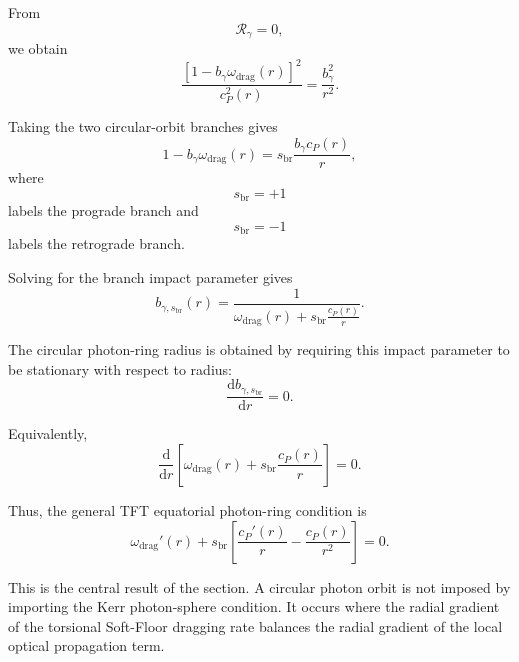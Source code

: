From
\begin{equation}
    \mathcal{R}_{\gamma} = 0,
\end{equation}
we obtain
\begin{equation}
    \frac{\left[ 1 - b_{\gamma}\omega_{\mathrm{drag}}(r) \right]^2}{c_P^2(r)} = \frac{b_{\gamma}^2}{r^2}.
\end{equation}

Taking the two circular-orbit branches gives
\begin{equation}
    1 - b_{\gamma}\omega_{\mathrm{drag}}(r) = s_{\mathrm{br}} \frac{b_{\gamma}c_P(r)}{r},
\end{equation}
where
\begin{equation}
    s_{\mathrm{br}} = +1
\end{equation}
labels the prograde branch and
\begin{equation}
    s_{\mathrm{br}} = -1
\end{equation}
labels the retrograde branch.

Solving for the branch impact parameter gives
\begin{equation}
    b_{\gamma,s_{\mathrm{br}}}(r) = \frac{1}{ \omega_{\mathrm{drag}}(r) + s_{\mathrm{br}}\frac{c_P(r)}{r} }.
\end{equation}

The circular photon-ring radius is obtained by requiring this impact parameter to be stationary with respect to radius:
\begin{equation}
    \frac{\mathrm{d} b_{\gamma,s_{\mathrm{br}}}}{\mathrm{d}r} = 0.
\end{equation}

Equivalently,
\begin{equation}
    \frac{\mathrm{d}}{\mathrm{d}r} \left[ \omega_{\mathrm{drag}}(r) + s_{\mathrm{br}} \frac{c_P(r)}{r} \right] = 0.
\end{equation}

Thus, the general TFT equatorial photon-ring condition is
\begin{equation}
    \boxed{ \omega_{\mathrm{drag}}'(r) + s_{\mathrm{br}} \left[ \frac{c_P'(r)}{r} - \frac{c_P(r)}{r^2} \right] = 0. }
\end{equation}

This is the central result of the section. A circular photon orbit is not imposed by importing the Kerr photon-sphere condition. It occurs where the radial gradient of the torsional Soft-Floor dragging rate balances the radial gradient of the local optical propagation term.

